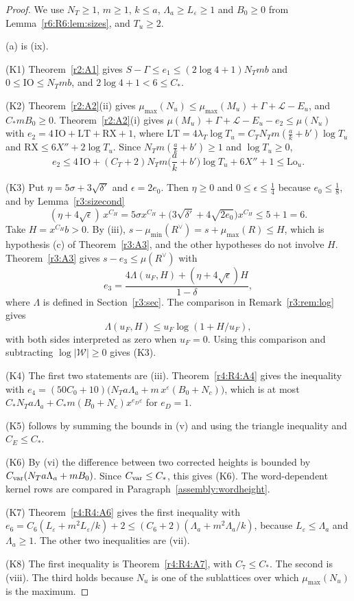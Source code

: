 \begin{proof}
We use $N_T\ge1$, $m\ge1$, $k\le a$, $\Lambda_a\ge L_\varepsilon\ge1$ and $B_0\ge0$ from Lemma~\ref{r6:R6:lem:sizes}, and $T_u\ge2$.

(a) is (ix).

(K1) Theorem~\ref{r2:A1} gives $S-\Gamma\le e_1\le(2\log4+1)N_Tmb$ and $0\le\mathrm{IO}\le N_Tmb$, and $2\log4+1<6\le C_\ast$.

(K2) Theorem~\ref{r2:A2}(ii) gives $\mu_{\max}(N_u)\le\mu_{\max}(M_u)+\Gamma+\mathcal L-E_u$, and $C_\ast mB_0\ge0$. Theorem~\ref{r2:A2}(i) gives $\mu(M_u)+\Gamma+\mathcal L-E_u-e_2\le\mu(N_u)$ with $e_2=4\,\mathrm{IO}+\mathrm{LT}+\mathrm{RX}+1$, where $\mathrm{LT}=4\lambda_T\log T_u=C_TN_Tm(\frac ak+b')\log T_u$ and $\mathrm{RX}\le6X''+2\log T_u$. Since $N_Tm(\frac ak+b')\ge1$ and $\log T_u\ge0$,
\[
e_2\le4\,\mathrm{IO}+(C_T+2)N_Tm\Big(\frac ak+b'\Big)\log T_u+6X''+1\le\mathrm{Lo}_u .
\]

(K3) Put $\eta=5\sigma+3\sqrt{\delta'}$ and $\epsilon=2e_0$. Then $\eta\ge0$ and $0\le\epsilon\le\frac14$ because $e_0\le\frac18$, and by Lemma~\ref{r3:sizecond}
\[
(\eta+4\sqrt\epsilon)\,x^{C_H}=5\sigma x^{C_H}+\big(3\sqrt{\delta'}+4\sqrt{2e_0}\big)x^{C_H}\le5+1=6 .
\]
Take $H=x^{C_H}b>0$.
By (iii),
$s-\mu_{\min}(R^\vee)=s+\mu_{\max}(R)\le H$,
which is hypothesis (c) of Theorem~\ref{r3:A3},
and the other hypotheses do not involve $H$.
Theorem~\ref{r3:A3} gives
$s-e_3\le\mu(R^\vee)$ with
\[
e_3=
\frac{4\Lambda(u_F,H)+(\eta+4\sqrt\epsilon)H}
{1-\delta},
\]
where $\Lambda$ is defined in Section~\ref{r3:sec}.
The comparison in Remark~\ref{r3:rem:log} gives
\[
\Lambda(u_F,H)\le u_F\log(1+H/u_F),
\]
with both sides interpreted as zero when $u_F=0$.
Using this comparison and subtracting
$\log\lvert\mathcal W\rvert\ge0$ gives (K3).

(K4) The first two statements are (iii). Theorem~\ref{r4:R4:A4} gives the inequality with $e_4=(50C_0+10)\big(N_Ta\Lambda_a+m\,x^\varepsilon(B_0+N_c)\big)$, which is at most $C_\ast N_Ta\Lambda_a+C_\ast m(B_0+N_c)x^{e_D\varepsilon}$ for $e_D=1$.

(K5) follows by summing the bounds in (v) and using the triangle inequality and $C_E\le C_\ast$.

(K6) By (vi) the difference between two corrected heights
is bounded by $C_{\rm var}(N_Ta\Lambda_a+mB_0)$.
Since $C_{\rm var}\le C_\ast$, this gives (K6).
The word-dependent kernel rows are compared in Paragraph~\ref{assembly:wordheight}.

(K7) Theorem~\ref{r4:R4:A6} gives the first inequality with $e_6=C_6(L_\varepsilon+m^2L_\varepsilon/k)+2\le(C_6+2)(\Lambda_a+m^2\Lambda_a/k)$, because $L_\varepsilon\le\Lambda_a$ and $\Lambda_a\ge1$. The other two inequalities are (vii).

(K8) The first inequality is Theorem~\ref{r4:R4:A7}, with $C_7\le C_\ast$. The second is (viii). The third holds because $N_u$ is one of the sublattices over which $\mu_{\max}(N_u)$ is the maximum.
\end{proof}

